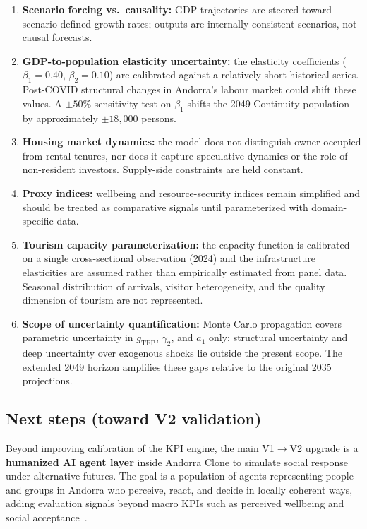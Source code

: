 \documentclass{article}
\begin{document}
\begin{enumerate}
    \item \textbf{Scenario forcing vs.\ causality:} GDP trajectories are steered
          toward scenario-defined growth rates; outputs are internally consistent
          scenarios, not causal forecasts.
    \item \textbf{GDP-to-population elasticity uncertainty:} the elasticity
          coefficients ($\beta_1=0.40$, $\beta_2=0.10$) are calibrated against
          a relatively short historical series. Post-COVID structural changes in
          Andorra's labour market could shift these values. A $\pm50\%$
          sensitivity test on $\beta_1$ shifts the 2049 Continuity population
          by approximately $\pm18{,}000$ persons.
    \item \textbf{Housing market dynamics:} the model does not distinguish
          owner-occupied from rental tenures, nor does it capture speculative
          dynamics or the role of non-resident investors. Supply-side constraints
          are held constant.
    \item \textbf{Proxy indices:} wellbeing and resource-security indices remain
          simplified and should be treated as comparative signals until
          parameterized with domain-specific data.
    \item \textbf{Tourism capacity parameterization:} the capacity function is
          calibrated on a single cross-sectional observation (2024) and the
          infrastructure elasticities are assumed rather than empirically
          estimated from panel data. Seasonal distribution of arrivals, visitor
          heterogeneity, and the quality dimension of tourism are not represented.
    \item \textbf{Scope of uncertainty quantification:} Monte Carlo propagation
          covers parametric uncertainty in $g_\text{TFP}$, $\gamma_2$, and
          $a_1$ only; structural uncertainty and deep uncertainty over exogenous
          shocks lie outside the present scope. The extended 2049 horizon
          amplifies these gaps relative to the original 2035 projections.
\end{enumerate}

\subsection{Next steps (toward V2 validation)}

Beyond improving calibration of the KPI engine, the main V1$\rightarrow$V2
upgrade is a \textbf{humanized AI agent layer} inside Andorra Clone to simulate
social response under alternative futures. The goal is a population of agents
representing people and groups in Andorra who perceive, react, and decide in
locally coherent ways, adding evaluation signals beyond macro KPIs such as
perceived wellbeing and social
acceptance~\cite{adornetto2025generative,garcia2025simulating,carrero2024integrating,li2025hugagent}.
\end{document}
